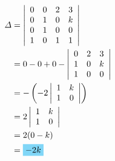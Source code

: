 \begin{align*}
	\Delta &=\left|
	\begin{array}{cccc}
		0&0&2&3 \\
		0&1&0&k \\
		0&1&0&0 \\
		1&0&1&1 \\
	\end{array}
	\right| \\
	&= 0-0+0-\left|
	\begin{array}{ccc}
		0&2&3 \\
		1&0&k \\
		1&0&0 \\
	\end{array}
	\right| \\
	&= -\left(-2\left|
	\begin{array}{cc}
		1&k \\
		1&0 \\
	\end{array}
	\right|\right) \\
	&= 2\left|
	\begin{array}{cc}
		1&k \\
		1&0 \\
	\end{array}
	\right| \\
	&=2(0-k) \\
	&=\hlbox{$-2k$}
\end{align*}